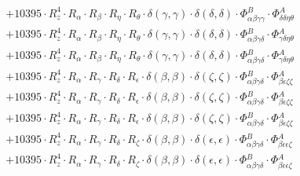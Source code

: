 \documentclass{article}
\begin{document}
\begin{subequations}
\begin{gather}
\begin{array}{c}
 \\[0.2em] 		 + 10395 \cdot R_{z}^{4} \cdot R_{\alpha{}} \cdot R_{\beta{}} \cdot R_{\eta{}} \cdot R_{\theta{}} \cdot \delta{}\left(\gamma{}, \gamma{}\right) \cdot \delta{}\left(\delta{}, \delta{}\right) \cdot \Phi{}^{B}_{\alpha{}\beta{}\gamma{}\gamma{}} \cdot \Phi{}^{A}_{\delta{}\delta{}\eta{}\theta{}} 
 \\[0.2em] 		 + 10395 \cdot R_{z}^{4} \cdot R_{\alpha{}} \cdot R_{\beta{}} \cdot R_{\eta{}} \cdot R_{\theta{}} \cdot \delta{}\left(\gamma{}, \gamma{}\right) \cdot \delta{}\left(\delta{}, \delta{}\right) \cdot \Phi{}^{B}_{\alpha{}\beta{}\gamma{}\delta{}} \cdot \Phi{}^{A}_{\gamma{}\delta{}\eta{}\theta{}} 
 \\[0.2em] 		 + 10395 \cdot R_{z}^{4} \cdot R_{\alpha{}} \cdot R_{\beta{}} \cdot R_{\eta{}} \cdot R_{\theta{}} \cdot \delta{}\left(\gamma{}, \gamma{}\right) \cdot \delta{}\left(\delta{}, \delta{}\right) \cdot \Phi{}^{B}_{\alpha{}\beta{}\gamma{}\delta{}} \cdot \Phi{}^{A}_{\gamma{}\delta{}\eta{}\theta{}} 
 \\[0.2em] 		 + 10395 \cdot R_{z}^{4} \cdot R_{\alpha{}} \cdot R_{\gamma{}} \cdot R_{\delta{}} \cdot R_{\epsilon{}} \cdot \delta{}\left(\beta{}, \beta{}\right) \cdot \delta{}\left(\zeta{}, \zeta{}\right) \cdot \Phi{}^{B}_{\alpha{}\beta{}\gamma{}\delta{}} \cdot \Phi{}^{A}_{\beta{}\epsilon{}\zeta{}\zeta{}} 
 \\[0.2em] 		 + 10395 \cdot R_{z}^{4} \cdot R_{\alpha{}} \cdot R_{\gamma{}} \cdot R_{\delta{}} \cdot R_{\epsilon{}} \cdot \delta{}\left(\beta{}, \beta{}\right) \cdot \delta{}\left(\zeta{}, \zeta{}\right) \cdot \Phi{}^{B}_{\alpha{}\beta{}\gamma{}\delta{}} \cdot \Phi{}^{A}_{\beta{}\epsilon{}\zeta{}\zeta{}} 
 \\[0.2em] 		 + 10395 \cdot R_{z}^{4} \cdot R_{\alpha{}} \cdot R_{\gamma{}} \cdot R_{\delta{}} \cdot R_{\epsilon{}} \cdot \delta{}\left(\beta{}, \beta{}\right) \cdot \delta{}\left(\zeta{}, \zeta{}\right) \cdot \Phi{}^{B}_{\alpha{}\beta{}\gamma{}\delta{}} \cdot \Phi{}^{A}_{\beta{}\epsilon{}\zeta{}\zeta{}} 
 \\[0.2em] 		 + 10395 \cdot R_{z}^{4} \cdot R_{\alpha{}} \cdot R_{\gamma{}} \cdot R_{\delta{}} \cdot R_{\zeta{}} \cdot \delta{}\left(\beta{}, \beta{}\right) \cdot \delta{}\left(\epsilon{}, \epsilon{}\right) \cdot \Phi{}^{B}_{\alpha{}\beta{}\gamma{}\delta{}} \cdot \Phi{}^{A}_{\beta{}\epsilon{}\epsilon{}\zeta{}} 
 \\[0.2em] 		 + 10395 \cdot R_{z}^{4} \cdot R_{\alpha{}} \cdot R_{\gamma{}} \cdot R_{\delta{}} \cdot R_{\zeta{}} \cdot \delta{}\left(\beta{}, \beta{}\right) \cdot \delta{}\left(\epsilon{}, \epsilon{}\right) \cdot \Phi{}^{B}_{\alpha{}\beta{}\gamma{}\delta{}} \cdot \Phi{}^{A}_{\beta{}\epsilon{}\epsilon{}\zeta{}} 

\end{array}
\end{gather}
\end{subequations}
\end{document}
